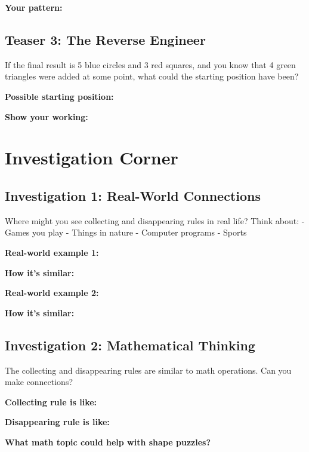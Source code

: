 \documentclass{article}
\begin{document}
\textbf{Your pattern:}
\vspace{4cm}

\subsection*{Teaser 3: The Reverse Engineer}
If the final result is 5 blue circles and 3 red squares, and you know that 4 green triangles were added at some point, what could the starting position have been?

\textbf{Possible starting position:} \underline{\hspace{6cm}}

\textbf{Show your working:}
\vspace{3cm}

\section{Investigation Corner}

\subsection*{Investigation 1: Real-World Connections}
Where might you see collecting and disappearing rules in real life? Think about:
- Games you play
- Things in nature  
- Computer programs
- Sports

\textbf{Real-world example 1:} \underline{\hspace{6cm}}

\textbf{How it's similar:} \underline{\hspace{8cm}}

\textbf{Real-world example 2:} \underline{\hspace{6cm}}

\textbf{How it's similar:} \underline{\hspace{8cm}}

\subsection*{Investigation 2: Mathematical Thinking}
The collecting and disappearing rules are similar to math operations. Can you make connections?

\textbf{Collecting rule is like:} \underline{\hspace{6cm}}

\textbf{Disappearing rule is like:} \underline{\hspace{6cm}}

\textbf{What math topic could help with shape puzzles?} \underline{\hspace{6cm}}
\end{document}
